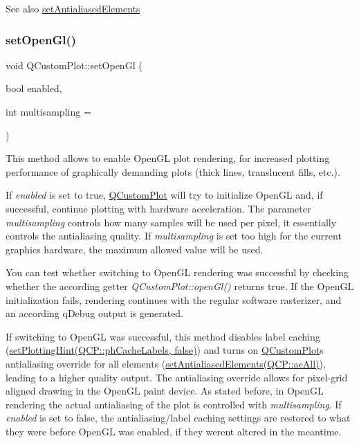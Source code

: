 \begin{DoxySeeAlso}{See also}
\hyperlink{class_q_custom_plot_af6f91e5eab1be85f67c556e98c3745e8}{set\+Antialiased\+Elements} 
\end{DoxySeeAlso}
\mbox{\label{class_q_custom_plot_a7db1adc09016329f3aef7c60da935789}} 
\subsubsection{\texorpdfstring{set\+Open\+Gl()}{setOpenGl()}}
{\footnotesize\ttfamily void Q\+Custom\+Plot\+::set\+Open\+Gl (\begin{DoxyParamCaption}\item[{bool}]{enabled,  }\item[{int}]{multisampling = {} }\end{DoxyParamCaption})}

This method allows to enable Open\+GL plot rendering, for increased plotting performance of graphically demanding plots (thick lines, translucent fills, etc.).

If {\itshape enabled} is set to true, \hyperlink{class_q_custom_plot}{Q\+Custom\+Plot} will try to initialize Open\+GL and, if successful, continue plotting with hardware acceleration. The parameter {\itshape multisampling} controls how many samples will be used per pixel, it essentially controls the antialiasing quality. If {\itshape multisampling} is set too high for the current graphics hardware, the maximum allowed value will be used.

You can test whether switching to Open\+GL rendering was successful by checking whether the according getter {\itshape Q\+Custom\+Plot\+::open\+Gl()} returns true. If the Open\+GL initialization fails, rendering continues with the regular software rasterizer, and an according q\+Debug output is generated.

If switching to Open\+GL was successful, this method disables label caching (\hyperlink{class_q_custom_plot_a3b7c97bb6c16464e9e15190c07abe9a9}{set\+Plotting\+Hint(Q\+CP\+:\+:ph\+Cache\+Labels, false)}) and turns on \hyperlink{class_q_custom_plot}{Q\+Custom\+Plot}\textquotesingle{}s antialiasing override for all elements (\hyperlink{class_q_custom_plot_af6f91e5eab1be85f67c556e98c3745e8}{set\+Antialiased\+Elements(Q\+CP\+:\+:ae\+All)}), leading to a higher quality output. The antialiasing override allows for pixel-\/grid aligned drawing in the Open\+GL paint device. As stated before, in Open\+GL rendering the actual antialiasing of the plot is controlled with {\itshape multisampling}. If {\itshape enabled} is set to false, the antialiasing/label caching settings are restored to what they were before Open\+GL was enabled, if they weren\textquotesingle{}t altered in the meantime.

